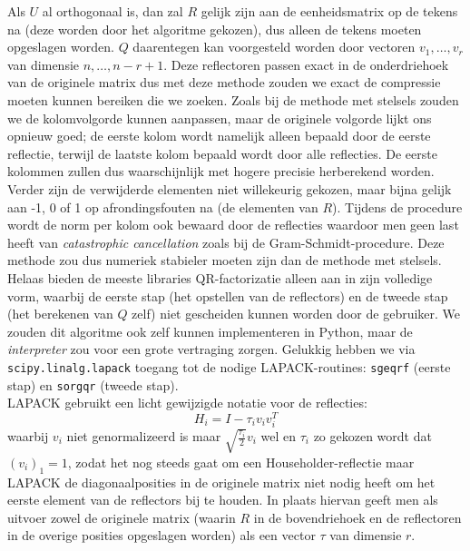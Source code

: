 Als $U$ al orthogonaal is, dan zal $R$ gelijk zijn aan de eenheidsmatrix op de tekens na (deze worden door het algoritme gekozen), dus alleen de tekens moeten opgeslagen worden. $Q$ daarentegen kan voorgesteld worden door vectoren $v_1, \dots, v_r$ van dimensie $n, \dots, n - r + 1$. Deze reflectoren passen exact in de onderdriehoek van de originele matrix dus met deze methode zouden we exact de compressie moeten kunnen bereiken die we zoeken. Zoals bij de methode met stelsels zouden we de kolomvolgorde kunnen aanpassen, maar de originele volgorde lijkt ons opnieuw goed; de eerste kolom wordt namelijk alleen bepaald door de eerste reflectie, terwijl de laatste kolom bepaald wordt door alle reflecties. De eerste kolommen zullen dus waarschijnlijk met hogere precisie herberekend worden.\\

Verder zijn de verwijderde elementen niet willekeurig gekozen, maar bijna gelijk aan -1, 0 of 1 op afrondingsfouten na (de elementen van $R$). Tijdens de procedure wordt de norm per kolom ook bewaard door de reflecties waardoor men geen last heeft van \textit{catastrophic cancellation} zoals bij de Gram-Schmidt-procedure. Deze methode zou dus numeriek stabieler moeten zijn dan de methode met stelsels.\\

Helaas bieden de meeste libraries QR-factorizatie alleen aan in zijn volledige vorm, waarbij de eerste stap (het opstellen van de reflectors) en de tweede stap (het berekenen van $Q$ zelf) niet gescheiden kunnen worden door de gebruiker. We zouden dit algoritme ook zelf kunnen implementeren in Python, maar de \textit{interpreter} zou voor een grote vertraging zorgen. Gelukkig hebben we via \texttt{scipy.linalg.lapack} toegang tot de nodige LAPACK-routines: \texttt{sgeqrf} (eerste stap) en \texttt{sorgqr} (tweede stap).\\

LAPACK gebruikt een licht gewijzigde notatie voor de reflecties:
\[
H_i = I - \tau_i v_i v_i^T
\]
waarbij $v_i$ niet genormalizeerd is maar $\sqrt{\frac{\tau_i}{2}} v_i$ wel en $\tau_i$ zo gekozen wordt dat $(v_i)_1 = 1$, zodat het nog steeds gaat om een Householder-reflectie maar LAPACK de diagonaalposities in de originele matrix niet nodig heeft om het eerste element van de reflectors bij te houden. In plaats hiervan geeft men als uitvoer zowel de originele matrix (waarin $R$ in de bovendriehoek en de reflectoren in de overige posities opgeslagen worden) als een vector $\tau$ van dimensie $r$.\\

